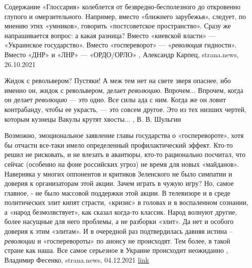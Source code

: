 Содержание «Глоссария» колеблется от безвредно-бесполезного до откровенно
глупого и омерзительного.  Например, вместо «ближнего зарубежья», следует, по
мнению этих «умников», говорить «постсоветское пространство». Сразу же
напрашивается вопрос: а какая разница?  Вместо «киевской власти» — «Украинское
государство».  Вместо «госпереворот» — «\emph{революция} гидности».  Вместо
«ДНР» и «ЛНР» — «ОРДО/ОРЛО»
, 
Александр Карпец, strana.news, 26.10.2021

Жидок с револьвером? Пустяки!  А меж тем нет на свете зверя опаснее, ибо именно
он, жидок с револьвером, делает \emph{революцию}.  Впрочем...  Впрочем, когда он
делает \emph{революцию} — это одно. Все силы ада с ним.  Когда же он ловит
контрабанду, чтобы ее украсть, —   это совсем другое.  Это из тех низших
чертей, которым кузнецы Вакулы крутят хвосты...
, В. В. Шульгин

Возможно, эмоциональное заявление главы государства о «госперевороте», хотя бы
отчасти все-таки имело определенный профилактический эффект. Кто-то решил не
рисковать, и не влезать в авантюры, кто-то рационально посчитал, что сейчас
(особенно на фоне российских угроз) не время для новых «майданов». Наверняка у
многих оппонентов и критиков Зеленского не было симпатии и доверия к
организаторам этой акции. Зачем играть в чужую игру? Но, самое главное, - не
было массовой поддержки этой акции. В телевизоре и в среде политических элит
кипят страсти, «кризис» в головах и в воспаленном сознании, а «народ
безмолвствует», как сказал когда-то классик. Народ волнуют другие, более
насущные для него проблемы, а не разборки «элит». Да нет и особого доверия к
этим «элитам».  И в очередной раз подтвердилась давняя истина –
\emph{революции} и «госперевороты» по анонсу не происходят. Тем более, в такой
стране как наша. Все самое серьезное в Украине происходит неожиданно
, 
Владимир Фесенко, strana.news, 04.12.2021
\href{https://strana.news/opinions/365396-revoljutsii-i-hosperevoroty-po-anonsu-nikohda-ne-nachinajutsja.html}{link}
